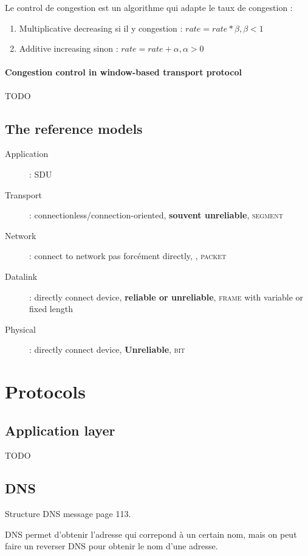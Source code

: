 Le control de congestion est un algorithme qui adapte le taux de congestion :
\begin{enumerate}
    \item Multiplicative decreasing si il y congestion : $rate = rate*\beta, \beta <1$
    \item Additive increasing sinon :  $rate =  rate + \alpha, \alpha>0$
\end{enumerate}

\paragraph{Congestion control in window-based transport protocol}
TODO

\subsection{The reference models}

\begin{description}
    \item[Application] : \textsc{SDU}
    \item[Transport] : connectionless/connection-oriented, \textbf{souvent unreliable}, \textsc{segment}
    \item[Network] : connect to network pas forcément directly, , \textsc{packet}
    \item[Datalink] : directly connect device, \textbf{reliable or unreliable}, \textsc{frame} with variable or fixed length
    \item[Physical] : directly connect device, \textbf{Unreliable}, \textsc{bit}
\end{description}


\section{Protocols}

\subsection{Application layer}
TODO

\subsection{DNS}
Structure DNS message page 113.

DNS permet d'obtenir l'adresse qui correpond à un certain nom, mais on peut
faire un reverser DNS pour obtenir le nom d'une adresse.

